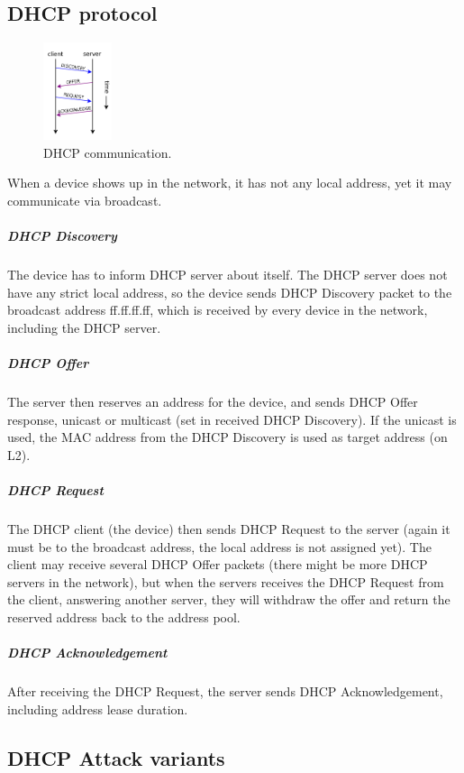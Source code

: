 \documentclass[10pt,a4paper,titlepage]{article}
\begin{document}
\subsection*{DHCP protocol}

\begin{figure}[h!]
    \begin{center}
        \includegraphics[width=0.18\textwidth]{dhcpcomm.png}
        \caption{ DHCP communication. \label{fig:dhcp} \cite{DHCPcomm}}
    \end{center}
\end{figure}

When a device shows up in the network, it has not any local address, yet
it may communicate via broadcast.

\subparagraph{DHCP Discovery}
The device has to inform DHCP server about itself. The DHCP server does not have
any strict local address, so the device sends DHCP Discovery packet to the
broadcast address ff.ff.ff.ff, which is received by every device in the
network, including the DHCP server.

\subparagraph{DHCP Offer}
The server then reserves an address for the device, and sends DHCP Offer
response, unicast or multicast (set in received DHCP Discovery). If the
unicast is used, the MAC address from the DHCP Discovery is used as target
address (on L2).

\subparagraph{DHCP Request}
The DHCP client (the device) then sends DHCP Request to the server (again
it must be to the broadcast address, the local address is not assigned yet).
The client may receive several DHCP Offer packets (there might be more DHCP
servers in the network), but when the servers receives the DHCP Request from
the client, answering another server, they will withdraw the offer and return
the reserved address back to the address pool.

\subparagraph{DHCP Acknowledgement}
After receiving the DHCP Request, the server sends DHCP Acknowledgement,
including address lease duration. \cite{mistrovstvivsitich} \cite{DHCPwikipedia}
\cite{IPKDHCP}



\subsection*{DHCP Attack variants}
\end{document}
